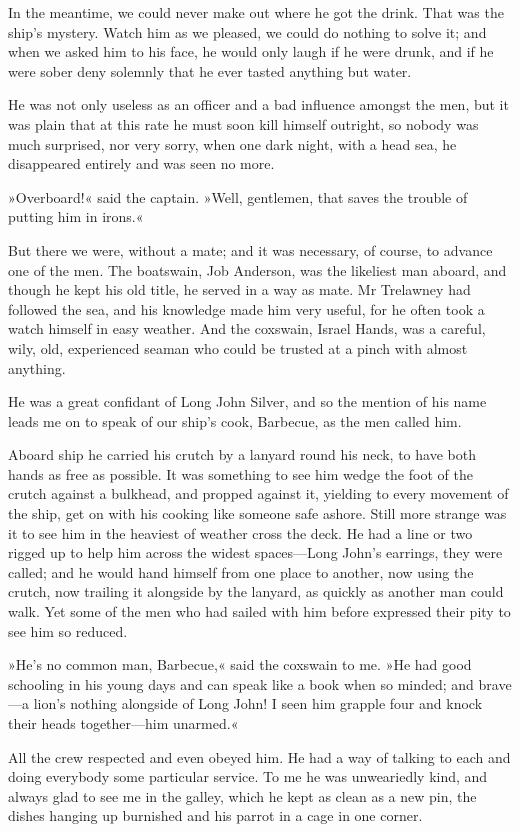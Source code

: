 In the meantime, we could never make out where he got the drink. That was the ship's mystery. Watch him as we pleased, we could do nothing to solve it; and when we asked him to his face, he would only laugh if he were drunk, and if he were sober deny solemnly that he ever tasted anything but water.

He was not only useless as an officer and a bad influence amongst the men, but it was plain that at this rate he must soon kill himself outright, so nobody was much surprised, nor very sorry, when one dark night, with a head sea, he disappeared entirely and was seen no more.

»Overboard!« said the captain. »Well, gentlemen, that saves the trouble of putting him in irons.«

But there we were, without a mate; and it was necessary, of course, to advance one of the men. The boatswain, Job Anderson, was the likeliest man aboard, and though he kept his old title, he served in a way as mate. Mr Trelawney had followed the sea, and his knowledge made him very useful, for he often took a watch himself in easy weather. And the coxswain, Israel Hands, was a careful, wily, old, experienced seaman who could be trusted at a pinch with almost anything.

He was a great confidant of Long John Silver, and so the mention of his name leads me on to speak of our ship's cook, Barbecue, as the men called him.

Aboard ship he carried his crutch by a lanyard round his neck, to have both hands as free as possible. It was something to see him wedge the foot of the crutch against a bulkhead, and propped against it, yielding to every movement of the ship, get on with his cooking like someone safe ashore. Still more strange was it to see him in the heaviest of weather cross the deck. He had a line or two rigged up to help him across the widest spaces—Long John's earrings, they were called; and he would hand himself from one place to another, now using the crutch, now trailing it alongside by the lanyard, as quickly as another man could walk. Yet some of the men who had sailed with him before expressed their pity to see him so reduced.

»He's no common man, Barbecue,« said the coxswain to me. »He had good schooling in his young days and can speak like a book when so minded; and brave—a lion's nothing alongside of Long John! I seen him grapple four and knock their heads together—him unarmed.«

All the crew respected and even obeyed him. He had a way of talking to each and doing everybody some particular service. To me he was unweariedly kind, and always glad to see me in the galley, which he kept as clean as a new pin, the dishes hanging up burnished and his parrot in a cage in one corner.

